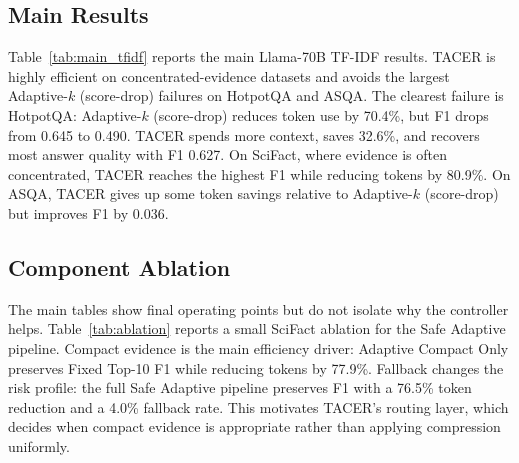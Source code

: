 \documentclass[11pt]{article}
\begin{document}
\subsection{Main Results}

Table~\ref{tab:main_tfidf} reports the main Llama-70B TF-IDF results. TACER is highly efficient on concentrated-evidence datasets and avoids the largest Adaptive-$k$ (score-drop) failures on HotpotQA and ASQA. The clearest failure is HotpotQA: Adaptive-$k$ (score-drop) reduces token use by 70.4\%, but F1 drops from 0.645 to 0.490. TACER spends more context, saves 32.6\%, and recovers most answer quality with F1 0.627. On SciFact, where evidence is often concentrated, TACER reaches the highest F1 while reducing tokens by 80.9\%. On ASQA, TACER gives up some token savings relative to Adaptive-$k$ (score-drop) but improves F1 by 0.036.

\begin{table}[t]
\centering
\small
\caption{Main Llama-70B TF-IDF results. Reductions are relative to Fixed Top-10.}
\label{tab:main_tfidf}
\end{table}

\subsection{Component Ablation}

The main tables show final operating points but do not isolate why the controller helps. Table~\ref{tab:ablation} reports a small SciFact ablation for the Safe Adaptive pipeline. Compact evidence is the main efficiency driver: Adaptive Compact Only preserves Fixed Top-10 F1 while reducing tokens by 77.9\%. Fallback changes the risk profile: the full Safe Adaptive pipeline preserves F1 with a 76.5\% token reduction and a 4.0\% fallback rate. This motivates TACER's routing layer, which decides when compact evidence is appropriate rather than applying compression uniformly.
\end{document}
